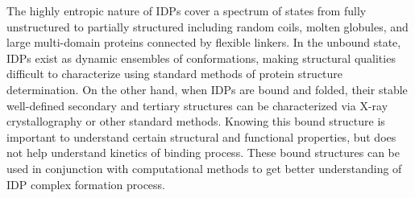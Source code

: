 \documentclass[../talant.diss.submit.tex]{subfiles}
\begin{document}
The highly entropic nature of IDPs cover a spectrum of states from fully
unstructured to partially structured including random coils, molten globules,
and large multi-domain proteins connected by flexible linkers.
In the unbound state, IDPs exist as dynamic ensembles of conformations, making
structural qualities difficult to characterize using standard methods of protein
structure determination. On the other hand, when IDPs are bound and folded,
their stable well-defined secondary and tertiary structures can be characterized
via X-ray crystallography or other standard methods.  Knowing this bound
structure is important to understand certain structural and functional
properties, but does not help understand kinetics of binding process. These
bound structures can be used in conjunction with computational methods to get
better understanding of IDP complex formation process.

\end{document}
